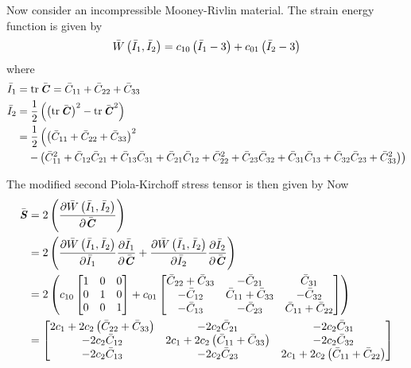 Now consider an incompressible Mooney-Rivlin material. The strain energy function is given by
\begin{equation}
   \bar{W}\left( \bar{I}_{1},\bar{I}_{2} \right) =c_{10}\left( \bar{I}_{1}-3 \right)+c_{01}\left( \bar{I}_{2}-3 \right)
\end{equation}
where
\begin{equation}
  \begin{split}
    \bar{I}_{1}&=\trace{}{\bar{\tensor{C}}}=\bar{C}_{11}+\bar{C}_{22}+\bar{C}_{33} \\
    \bar{I}_{2}&=\frac{1}{2}\pbrac{\pbrac{\trace{}{\bar{\tensor{C}}}}^{2}-\trace{}{\bar{\tensor{C}}^{2}}} \\
    &=\dfrac{1}{2}\left(\pbrac{\bar{C}_{11}+\bar{C}_{22}+\bar{C}_{33}}^{2}\right. \\
    & \quad\left.-\pbrac{\bar{C}_{11}^{2}+\bar{C}_{12}\bar{C}_{21}+\bar{C}_{13}\bar{C}_{31}+
      \bar{C}_{21}\bar{C}_{12}+\bar{C}_{22}^{2}+\bar{C}_{23}\bar{C}_{32}+\bar{C}_{31}\bar{C}_{13}+
      \bar{C}_{32}\bar{C}_{23}+\bar{C}_{33}^{2}}\right)
  \end{split}
\end{equation}

The modified second Piola-Kirchoff stress tensor is then given by
Now
\begin{equation}
  \begin{split}
    \bar{\boldsymbol{\mathit{S}}}&=2\left(  \dfrac{\partial  \bar{W}\left( \bar{I}_{1},\bar{I}_{2} \right) }{\partial \bar{\boldsymbol{\mathit{C}}}}  \right)\\
    &=2\left(  \dfrac{\partial  \bar{W}\left( \bar{I}_{1},\bar{I}_{2} \right) }{\partial \bar{I}_{1}}  \dfrac{\partial \bar{I}_{1}}{\partial \bar{\boldsymbol{\mathit{C}}}} + \dfrac{\partial  \bar{W}\left( \bar{I}_{1},\bar{I}_{2} \right) }{\partial \bar{I}_{2}}  \dfrac{\partial \bar{I}_{2}}{\partial \bar{\boldsymbol{\mathit{C}}}}  \right)\\
    &=2\left( c_{10}\begin{bmatrix}
        1 & 0 & 0 \\
        0 & 1 & 0 \\
        0 & 0 & 1
      \end{bmatrix}+c_{01}\begin{bmatrix}
        \bar{C}_{22}+\bar{C}_{33} & -\bar{C}_{21} & \bar{C}_{31} \\
        -\bar{C}_{12} & \bar{C}_{11}+\bar{C}_{33} & -\bar{C}_{32} \\
        -\bar{C}_{13} & -\bar{C}_{23} & \bar{C}_{11}+\bar{C}_{22}
    \end{bmatrix} \right) \\
    &=\begin{bmatrix}
    2c_{1}+2c_{2}\left( \bar{C}_{22}+\bar{C}_{33} \right) & -2c_{2}\bar{C}_{21} &
    -2c_{2}\bar{C}_{31} \\
    -2c_{2}\bar{C}_{12} & 2c_{1}+2c_{2}\left( \bar{C}_{11}+\bar{C}_{33} \right) & -2c_{2}\bar{C}_{32} \\
    -2c_{2}\bar{C}_{13} & -2c_{2}\bar{C}_{23} & 2c_{1}+2c_{2}\left( \bar{C}_{11}+\bar{C}_{22} \right) 
    \end{bmatrix}
  \end{split}
\end{equation}




